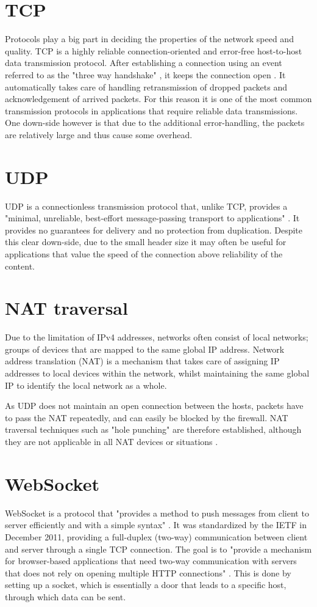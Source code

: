 \documentclass[bsc,frontabs,twoside,singlespacing,parskip,deptreport]{infthesis}     %
\begin{document}
\section{TCP}
Protocols play a big part in deciding the properties of the network speed and quality. TCP is a highly reliable connection-oriented and error-free host-to-host data transmission protocol. After establishing a connection using an event referred to as the "three way handshake" \cite{handshake}, it keeps the connection open \cite{tcp_open_connection}. It automatically takes care of handling retransmission of dropped packets and acknowledgement of arrived packets. For this reason it is one of the most common transmission protocols in applications that require reliable data transmissions. One down-side however is that due to the additional error-handling, the packets are relatively large and thus cause some overhead.

\section{UDP}
UDP is a connectionless transmission protocol that, unlike TCP, provides a "minimal, unreliable, best-effort message-passing transport to applications" \cite{udp_connectionless}. It provides no guarantees for delivery and no protection from duplication. Despite this clear down-side, due to the small header size it may often be useful for applications that value the speed of the connection above reliability of the content.

\section{NAT traversal}
Due to the limitation of IPv4 addresses, networks often consist of local networks; groups of devices that are mapped to the same global IP address. Network address translation (NAT) is a mechanism that takes care of assigning IP addresses to local devices within the network, whilst maintaining the same global IP to identify the local network as a whole.

As UDP does not maintain an open connection between the hosts, packets have to pass the NAT repeatedly, and can easily be blocked by the firewall. 
NAT traversal techniques such as "hole punching" are therefore established, although they are not applicable in all NAT devices or situations \cite{udp_holepunching}.

\section{WebSocket}
WebSocket is a protocol that "provides a method to push messages from client to server efficiently and with a simple syntax" \cite{WebSocket}. It was standardized by the IETF in December 2011, providing a full-duplex (two-way) communication between client and server through a single TCP connection. The goal is to "provide a mechanism for browser-based applications that need two-way communication with servers that does not rely on opening multiple HTTP connections" \cite{websocket_communication}. This is done by setting up a socket, which is essentially a door that leads to a specific host, through which data can be sent.
\end{document}
